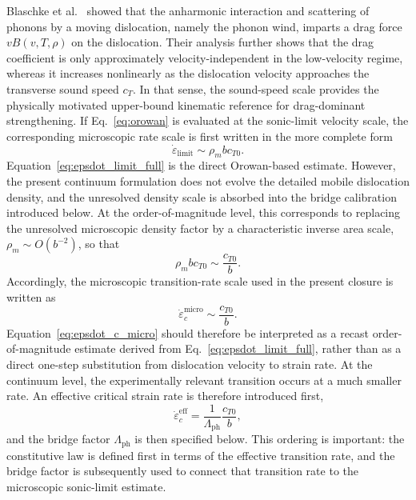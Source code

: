Blaschke et al.~\cite{Blaschke2019PhononWind} showed that the anharmonic interaction and scattering of phonons by a moving dislocation, namely the phonon wind, imparts a drag force $vB(v,T,\rho)$ on the dislocation. Their analysis further shows that the drag coefficient is only approximately velocity-independent in the low-velocity regime, whereas it increases nonlinearly as the dislocation velocity approaches the transverse sound speed $c_T$. In that sense, the sound-speed scale provides the physically motivated upper-bound kinematic reference for drag-dominant strengthening. If Eq.~\eqref{eq:orowan} is evaluated at the sonic-limit velocity scale, the corresponding microscopic rate scale is first written in the more complete form
\begin{equation}
\dot{\varepsilon}_{\mathrm{limit}} \sim \rho_m b c_{T0}.
\label{eq:epsdot_limit_full}
\end{equation}
Equation~\eqref{eq:epsdot_limit_full} is the direct Orowan-based estimate. However, the present continuum formulation does not evolve the detailed mobile dislocation density, and the unresolved density scale is absorbed into the bridge calibration introduced below. At the order-of-magnitude level, this corresponds to replacing the unresolved microscopic density factor by a characteristic inverse area scale, $\rho_m \sim O(b^{-2})$, so that
\begin{equation}
\rho_m b c_{T0} \sim \frac{c_{T0}}{b}.
\label{eq:epsdot_limit_recast}
\end{equation}
Accordingly, the microscopic transition-rate scale used in the present closure is written as
\begin{equation}
\dot{\varepsilon}^{\mathrm{micro}}_c \sim \frac{c_{T0}}{b}.
\label{eq:epsdot_c_micro}
\end{equation}
Equation~\eqref{eq:epsdot_c_micro} should therefore be interpreted as a recast order-of-magnitude estimate derived from Eq.~\eqref{eq:epsdot_limit_full}, rather than as a direct one-step substitution from dislocation velocity to strain rate.
At the continuum level, the experimentally relevant transition occurs at a much smaller rate. An effective critical strain rate is therefore introduced first,
\begin{equation}
\dot{\varepsilon}^{\mathrm{eff}}_c = \frac{1}{\Lambda_{\mathrm{ph}}}\frac{c_{T0}}{b},
\label{eq:epsdot_c_eff}
\end{equation}
and the bridge factor $\Lambda_{\mathrm{ph}}$ is then specified below. This ordering is important: the constitutive law is defined first in terms of the effective transition rate, and the bridge factor is subsequently used to connect that transition rate to the microscopic sonic-limit estimate.

